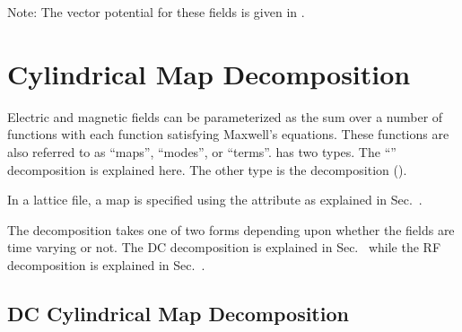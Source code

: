 Note: The vector potential for these fields is given in .

\section{Cylindrical Map Decomposition}
\label{s:cylind.map.phys}

Electric and magnetic fields can be parameterized as the sum over a number of functions with each
function satisfying Maxwell's equations. These functions are also referred to as ``maps'',
``modes'', or ``terms''. \bmad has two types. The ``'' decomposition is explained
here. The other type is the  decomposition ().

In a lattice file, a  map is specified using the  attribute as
explained in Sec.~.

The  decomposition takes one of two forms depending upon whether the fields are time
varying or not. The DC decomposition is explained in Sec.~ while the RF
decomposition is explained in Sec.~.

\subsection{DC Cylindrical Map Decomposition}
\label{s:cylind.dc}

